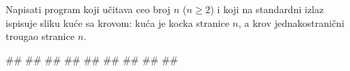 \begin{Exercise}[label=p1.7_] 
Napisati program koji učitava ceo broj $n$ ($n \geq 2$) i 
koji na standardni izlaz ispisuje sliku kuće sa krovom: kuća
je kocka stranice $n$, a krov jednakostranični trougao stranice
$n$.

\begin{miditest}
\begin{upotreba}{1}
#\naslovInt#
##
#\izlaz{\ \ \ *}#
#\izlaz{\ \ *\ *}#
#\izlaz{\ *\ \ \ *}#
#\izlaz{*\ *\ *\ *}#
#\izlaz{*\ \ \ \ \ *}#
#\izlaz{*\ \ \ \ \ *}#
#\izlaz{*\ *\ *\ *}#
\end{upotreba}
\end{miditest}
\end{Exercise}
\begin{Answer}[ref=p1.7_]
\end{Answer}



